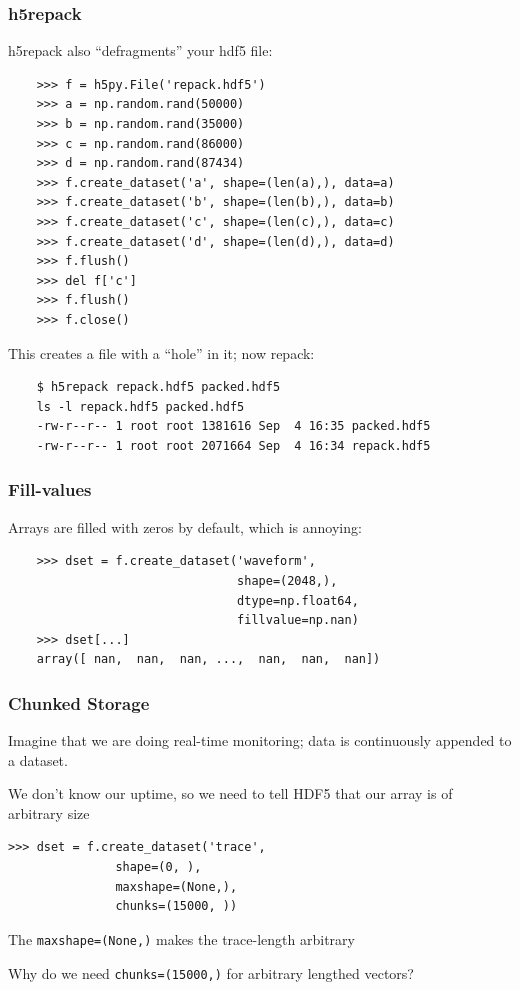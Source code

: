 \documentclass[9pt]{beamer}
\begin{document}
\begin{frame}[fragile]
  \frametitle{h5repack}
  h5repack also ``defragments'' your hdf5 file:
  \begin{verbatim}
    >>> f = h5py.File('repack.hdf5')
    >>> a = np.random.rand(50000)
    >>> b = np.random.rand(35000)
    >>> c = np.random.rand(86000)
    >>> d = np.random.rand(87434)
    >>> f.create_dataset('a', shape=(len(a),), data=a)
    >>> f.create_dataset('b', shape=(len(b),), data=b)
    >>> f.create_dataset('c', shape=(len(c),), data=c)
    >>> f.create_dataset('d', shape=(len(d),), data=d)
    >>> f.flush()
    >>> del f['c']
    >>> f.flush()
    >>> f.close()
  \end{verbatim}
  This creates a file with a ``hole'' in it; now repack:
  \begin{verbatim}
    $ h5repack repack.hdf5 packed.hdf5
    ls -l repack.hdf5 packed.hdf5
    -rw-r--r-- 1 root root 1381616 Sep  4 16:35 packed.hdf5
    -rw-r--r-- 1 root root 2071664 Sep  4 16:34 repack.hdf5
  \end{verbatim}
  
\end{frame}


\begin{frame}[fragile]
  \frametitle{Fill-values}
  Arrays are filled with zeros by default, which is annoying:
  \begin{verbatim}
    >>> dset = f.create_dataset('waveform',
                                shape=(2048,),
                                dtype=np.float64,
                                fillvalue=np.nan)
    >>> dset[...]
    array([ nan,  nan,  nan, ...,  nan,  nan,  nan])
  \end{verbatim}
\end{frame}

\begin{frame}[fragile]
\frametitle{Chunked Storage}
Imagine that we are doing real-time monitoring; data is continuously appended to a dataset.

We don't know our uptime, so we need to tell HDF5 that our array is of arbitrary size
\begin{verbatim}
>>> dset = f.create_dataset('trace',
               shape=(0, ),
               maxshape=(None,),
               chunks=(15000, ))
\end{verbatim}
The \texttt{maxshape=(None,)} makes the trace-length arbitrary

Why do we need \texttt{chunks=(15000,)} for arbitrary lengthed vectors?
\end{frame}
\end{document}
